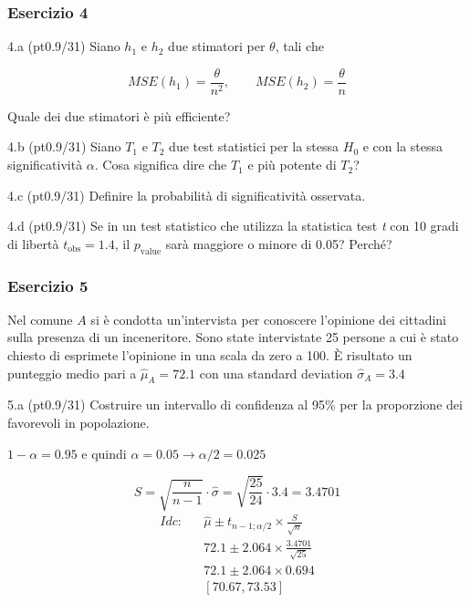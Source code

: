 \documentclass[
  10pt,
]{article}
\begin{document}
\subsubsection{Esercizio 4}\label{esercizio-4}

4.a (pt\hspace{.1em}0.9/31) Siano \(h_1\) e \(h_2\) due stimatori per \(\theta\), tali che

\[
  MSE(h_1) =  \frac{\theta}{n^2}, \qquad  MSE(h_2) =  \frac{\theta}{n}
\]

Quale dei due stimatori è più efficiente?

4.b (pt\hspace{.1em}0.9/31) Siano \(T_1\) e \(T_2\) due test statistici per la stessa \(H_0\) e con la stessa significatività \(\alpha\). Cosa significa dire che \(T_1\) e più potente di \(T_2\)?

4.c (pt\hspace{.1em}0.9/31) Definire la probabilità di significatività osservata.

4.d (pt\hspace{.1em}0.9/31) Se in un test statistico che utilizza la statistica test \emph{t} con 10 gradi di libertà \(t_\text{obs}=1.4\), il \(p_\text{value}\) sarà maggiore o minore di 0.05? Perché?

\subsubsection{Esercizio 5}\label{esercizio-5}

Nel comune \(A\) si è condotta un'intervista per conoscere l'opinione
dei cittadini sulla presenza di un inceneritore. Sono state intervistate
25 persone a cui è stato chiesto di esprimete l'opinione in una scala da zero a 100.
È risultato un punteggio medio pari a \(\hat\mu_A=72.1\) con una standard deviation
\(\hat\sigma_A=3.4\)

5.a (pt\hspace{.1em}0.9/31) Costruire un intervallo di confidenza al 95\%
per la proporzione dei favorevoli in popolazione.

\begin{sol}
\(1-\alpha =0.95\) e quindi \(\alpha=0.05\rightarrow \alpha/2=0.025\)

\[
      S  =\sqrt{\frac {n}{n-1}}\cdot\hat\sigma =
     \sqrt{\frac { 25 }{ 24 }}\cdot 3.4 = 3.4701 
\]
\begin{eqnarray*}
  Idc: & &  \hat\mu \pm  t_{n-1;\alpha/2} \times \frac{S}{\sqrt{n}} \\
     & &  72.1 \pm  2.064 \times \frac{ 3.4701 }{\sqrt{ 25 }} \\
     & &  72.1 \pm  2.064 \times  0.694 \\
     & & [ 70.67 ,  73.53 ]
\end{eqnarray*}

\end{sol}
\end{document}
